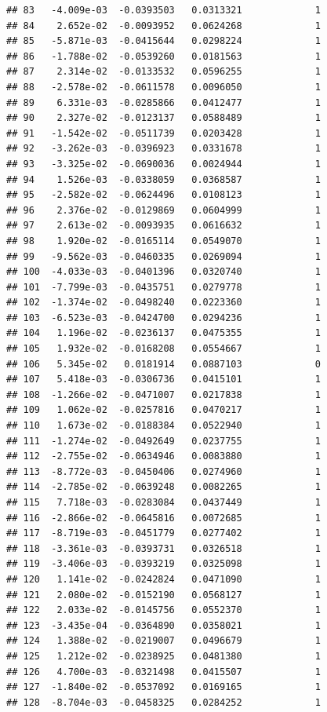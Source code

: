 \documentclass[12pt]{article}\usepackage[]{graphicx}\usepackage[]{xcolor}
\makeatletter
\newenvironment{kframe}{%
 \def\at@end@of@kframe{}%
 \ifinner\ifhmode%
  \def\at@end@of@kframe{\end{minipage}}%
  \begin{minipage}{\columnwidth}%
 \fi\fi%
 \def\FrameCommand##1{\hskip\@totalleftmargin \hskip-\fboxsep
 \colorbox{shadecolor}{##1}\hskip-\fboxsep
     \hskip-\linewidth \hskip-\@totalleftmargin \hskip\columnwidth}%
 \MakeFramed {\advance\hsize-\width
   \@totalleftmargin\z@ \linewidth\hsize
   \@setminipage}}%
 {\par\unskip\endMakeFramed%
 \at@end@of@kframe}
\newenvironment{knitrout}{}{} %
\makeatother
\begin{document}
\begin{knitrout}
\begin{kframe}
\begin{verbatim}
## 83   -4.009e-03  -0.0393503   0.0313321             1
## 84    2.652e-02  -0.0093952   0.0624268             1
## 85   -5.871e-03  -0.0415644   0.0298224             1
## 86   -1.788e-02  -0.0539260   0.0181563             1
## 87    2.314e-02  -0.0133532   0.0596255             1
## 88   -2.578e-02  -0.0611578   0.0096050             1
## 89    6.331e-03  -0.0285866   0.0412477             1
## 90    2.327e-02  -0.0123137   0.0588489             1
## 91   -1.542e-02  -0.0511739   0.0203428             1
## 92   -3.262e-03  -0.0396923   0.0331678             1
## 93   -3.325e-02  -0.0690036   0.0024944             1
## 94    1.526e-03  -0.0338059   0.0368587             1
## 95   -2.582e-02  -0.0624496   0.0108123             1
## 96    2.376e-02  -0.0129869   0.0604999             1
## 97    2.613e-02  -0.0093935   0.0616632             1
## 98    1.920e-02  -0.0165114   0.0549070             1
## 99   -9.562e-03  -0.0460335   0.0269094             1
## 100  -4.033e-03  -0.0401396   0.0320740             1
## 101  -7.799e-03  -0.0435751   0.0279778             1
## 102  -1.374e-02  -0.0498240   0.0223360             1
## 103  -6.523e-03  -0.0424700   0.0294236             1
## 104   1.196e-02  -0.0236137   0.0475355             1
## 105   1.932e-02  -0.0168208   0.0554667             1
## 106   5.345e-02   0.0181914   0.0887103             0
## 107   5.418e-03  -0.0306736   0.0415101             1
## 108  -1.266e-02  -0.0471007   0.0217838             1
## 109   1.062e-02  -0.0257816   0.0470217             1
## 110   1.673e-02  -0.0188384   0.0522940             1
## 111  -1.274e-02  -0.0492649   0.0237755             1
## 112  -2.755e-02  -0.0634946   0.0083880             1
## 113  -8.772e-03  -0.0450406   0.0274960             1
## 114  -2.785e-02  -0.0639248   0.0082265             1
## 115   7.718e-03  -0.0283084   0.0437449             1
## 116  -2.866e-02  -0.0645816   0.0072685             1
## 117  -8.719e-03  -0.0451779   0.0277402             1
## 118  -3.361e-03  -0.0393731   0.0326518             1
## 119  -3.406e-03  -0.0393219   0.0325098             1
## 120   1.141e-02  -0.0242824   0.0471090             1
## 121   2.080e-02  -0.0152190   0.0568127             1
## 122   2.033e-02  -0.0145756   0.0552370             1
## 123  -3.435e-04  -0.0364890   0.0358021             1
## 124   1.388e-02  -0.0219007   0.0496679             1
## 125   1.212e-02  -0.0238925   0.0481380             1
## 126   4.700e-03  -0.0321498   0.0415507             1
## 127  -1.840e-02  -0.0537092   0.0169165             1
## 128  -8.704e-03  -0.0458325   0.0284252             1

\end{verbatim}
\end{kframe}
\end{knitrout}
\end{document}
